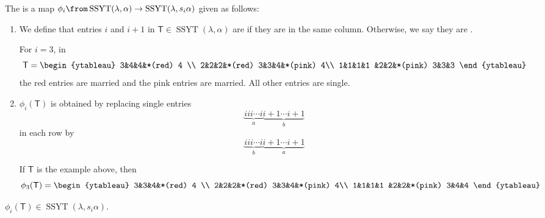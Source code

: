 \documentclass[11pt,leqno,oneside]{amsart}
\numberwithin{thm}{section}
\newcommand{\T}{\mathsf{T}} %
\newcommand{\SSYT}{\operatorname{SSYT}} %
\begin{document}
\begin{defn}
  The  is a map \(\phi_i \from
  \SSYT(\lambda, \alpha) \to \SSYT(\lambda, s_i \alpha)\) given as
  follows:
  \begin{enumerate}
  \item We define that entries \(i\) and \(i+1\) in \(\T \in
    \SSYT(\lambda,\alpha)\) are  if they are in the same
    column. Otherwise, we say they are .
    \begin{example}
      For \(i=3\), in \[
        \T = \begin{ytableau}
          3&4&4&*(red) 4 \\
          2&2&2&*(red) 3&3&4&*(pink) 4\\
          1&1&1&1       &2&2&*(pink) 3&3&3
        \end{ytableau}
      \]
      the red entries are married and the pink entries are
      married. All other entries are single.
    \end{example}
  \item \(\phi_i(\T)\) is obtained by replacing single entries \[
      \underbrace{iii\cdots i}_{a} \underbrace{i+1 \cdots i+1}_{b}
    \]
    in each row by \[
      \underbrace{iii\cdots i}_{b} \underbrace{i+1 \cdots i+1}_{a}
    \]
    \begin{example}
      If \(\T\) is the example above, then \[
        \phi_3(\T) = \begin{ytableau}
          3&3&4&*(red) 4 \\
          2&2&2&*(red) 3&3&4&*(pink) 4\\
          1&1&1&1       &2&2&*(pink) 3&4&4
        \end{ytableau}
      \]
    \end{example}
  \end{enumerate}
\end{defn}
\begin{prop}
  \(\phi_i(\T) \in \SSYT(\lambda, s_i \alpha)\).
\end{prop}
\end{document}
